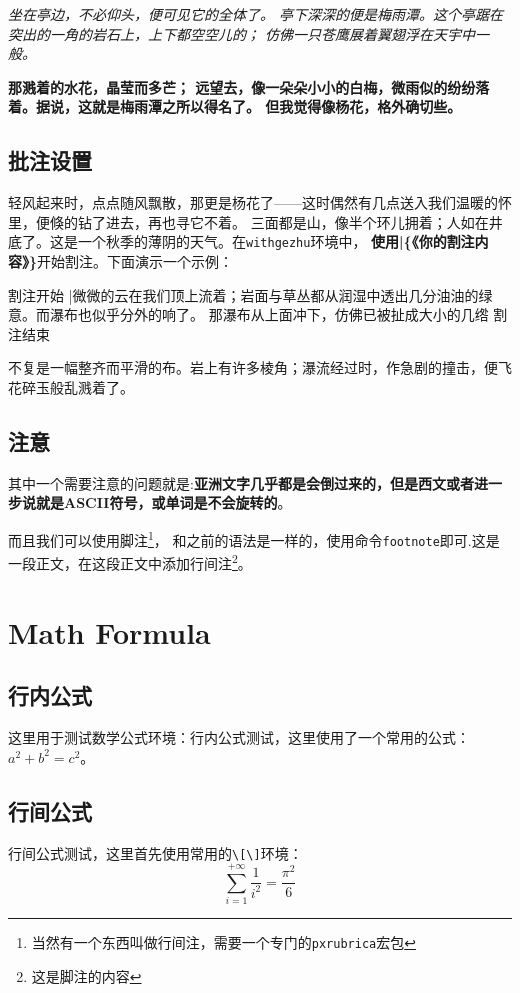 \documentclass{utarticle}
\begin{document}
\textit{坐在亭边，不必仰头，便可见它的全体了。
亭下深深的便是梅雨潭。这个亭踞在突出的一角的岩石上，上下都空空儿的；
仿佛一只苍鹰展着翼翅浮在天宇中一般。}

\textbf{那溅着的水花，晶莹而多芒；
远望去，像一朵朵小小的白梅，微雨似的纷纷落着。据说，这就是梅雨潭之所以得名了。
但我觉得像杨花，格外确切些。}


\subsection{批注设置}
轻风起来时，点点随风飘散，那更是杨花了——这时偶然有几点送入我们温暖的怀里，便倏的钻了进去，再也寻它不着。
三面都是山，像半个环儿拥着；人如在井底了。这是一个秋季的薄阴的天气。在\verb|withgezhu|环境中，
{\bfseries 使用|\{《你的割注内容》\}}开始割注。下面演示一个示例：

\begin{withgezhu}
割注开始
\begingroup
\color{blue}
|{微微的云在我们顶上流着；岩面与草丛都从润湿中透出几分油油的绿意。而瀑布也似乎分外的响了。
那瀑布从上面冲下，仿佛已被扯成大小的几绺}
\endgroup 
割注结束
\end{withgezhu}

{\kaishu 不复是一幅整齐而平滑的布。岩上有许多棱角；瀑流经过时，作急剧的撞击，便飞花碎玉般乱溅着了。}

\subsection{注意}
其中一个需要注意的问题就是:{\bfseries 亚洲文字几乎都是会倒过来的，但是西文或者进一步说就是ASCII符号，或单词是不会旋转的}。

而且我们可以使用脚注\footnote[1]{当然有一个东西叫做行间注，需要一个专门的\texttt{pxrubrica}宏包}，
和之前的语法是一样的，使用命令\verb|footnote|即可.这是一段正文，在这段正文中添加行间注\footnote[2]{这是脚注的内容}。



\clearpage
\section{Math Formula}
\subsection{行内公式}
这里用于测试数学公式环境：行内公式测试，这里使用了一个常用的公式：$a^2 + b^2 = c^2$。


\subsection{行间公式}
行间公式测试，这里首先使用常用的\verb|\[\]|环境：
\[
    \sum_{i=1}^{+\infty}{\frac{1}{i^2}} = \frac{\pi^2}{6}
\]
\end{document}
